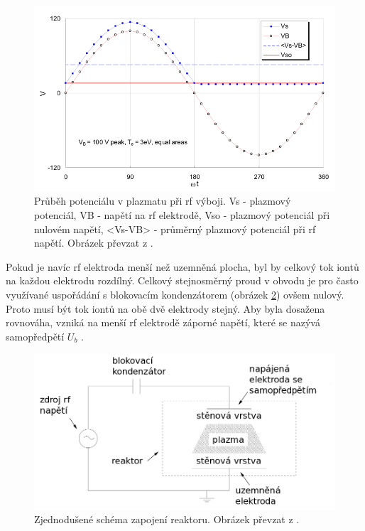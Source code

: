 \documentclass[12pt,oneside,final]{fithesis2}
\begin{document}
\begin{figure}
  \centering
  \includegraphics[width=120mm]{sheathdrop.png}
  \caption{Průběh potenciálu v plazmatu při rf výboji. Vs - plazmový potenciál, VB - napětí na rf elektrodě, Vso - plazmový potenciál při nulovém napětí, <Vs-VB> - průměrný plazmový potenciál při rf napětí. Obrázek převzat z \cite{chen2003sheet}.}
  \label{sheat}
\end{figure}


Pokud je navíc rf elektroda menší než uzemněná plocha, byl by celkový tok iontů na každou elektrodu rozdílný. Celkový stejnosměrný proud v obvodu je pro často využívané uspořádání s blokovacím kondenzátorem (obrázek \ref{reaktor}) ovšem nulový. Proto musí být tok iontů na obě dvě elektrody stejný. Aby byla dosažena rovnováha, vzniká na menší rf elektrodě záporné napětí, které se nazývá samopředpětí $U_b$ \cite{liebermanselfbias}.

\begin{figure}
  \centering
  \includegraphics[width=140mm]{reaktor.png}
  \caption{Zjednodušené schéma zapojení reaktoru. Obrázek převzat z \cite{lenkadizertace}.}
  \label{reaktor}
\end{figure}
\end{document}
